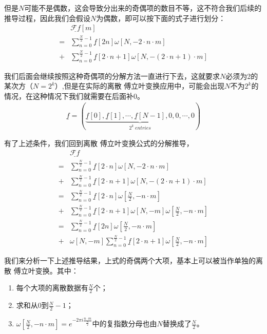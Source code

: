 但是$N$可能不是偶数，这会导致分出来的奇偶项的数目不等，这不符合我们后续的推导过程，因此我们会假设$N$为偶数，即可以按下面的式子进行划分：
\begin{align*}
	  & \underline{\mathcal{F}f}[m]                                                       \\
	= & \sum_{n=0}^{\frac{N}{2}-1}\underline{f}[2n]\omega[N,-2\cdot n\cdot m]             \\
	+ & \sum_{n=0}^{\frac{N}{2}-1}\underline{f}[2\cdot n+1]\omega[N,-(2\cdot n+1)\cdot m]
\end{align*}

我们后面会继续按照这种奇偶项的分解方法一直进行下去，这就要求$N$必须为2的某次方（$N=2^k$）,但是在实际的离散 傅立叶变换应用中，可能会出现$N$不为$2^k$的情况，在这种情况下我们就需要在后面补$0$。
\begin{align*}
	\underline{f} = (\underbrace{ \underline{f}[0],\underline{f}[1],\cdots,\underline{f}[N-1],0,0,\cdots,0 }_{2^k\ entries} )
\end{align*}

有了上述条件，我们回到离散 傅立叶变换公式的分解推导，
\begin{align*}
	  & \underline{\mathcal{F}f}                                                                     \\
	= & \sum_{n=0}^{\frac{N}{2}-1}\underline{f}[2\cdot n]\omega[N,-2\cdot n\cdot m]                  \\
	+ & \sum_{n=0}^{\frac{N}{2}-1}\underline{f}[2\cdot n+1]\omega[N,-(2\cdot n+1)\cdot m]            \\
	= & \sum_{n=0}^{\frac{N}{2}-1}\underline{f}[2\cdot n]\omega[\frac{N}{2},-n\cdot m]               \\
	+ & \sum_{n=0}^{\frac{N}{2}-1}\underline{f}[2\cdot n+1]\omega[N,-m]\omega[\frac{N}{2},-n\cdot m] \\
	= & \sum_{n=0}^{\frac{N}{2}-1}\underline{f}[2n]\omega[\frac{N}{2},-n\cdot m]                     \\
	+ & \omega[N,-m]\sum_{n=0}^{\frac{N}{2}-1}\underline{f}[2\cdot n+1]\omega[\frac{N}{2},-n\cdot m]
\end{align*}

我们来分析一下上述推导结果，上式的奇偶两个大项，基本上可以被当作单独的离散 傅立叶变换。其中：
\begin{enumerate}
	\item 每个大项的离散数据有$\frac{N}{2}$个；
	\item 求和从$0$到$\frac{N}{2}-1$；
	\item $\omega[\frac{N}{2},-n\cdot m] = e^{-2\pi i\frac{n\cdot m}{\frac{N}{2}}}$中的复指数分母也由$N$替换成了$\frac{N}{2}$。
\end{enumerate}

